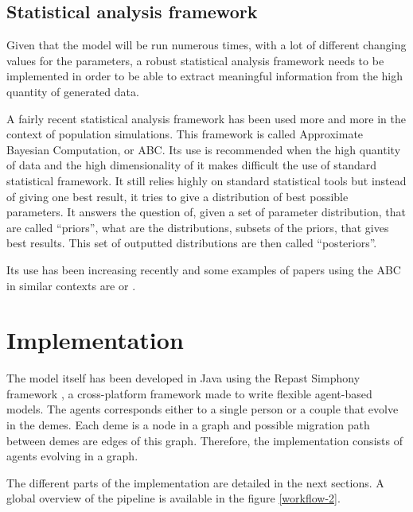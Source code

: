 \documentclass[a4paper,12pt]{report}
\begin{document}
\section{Statistical analysis framework}
Given that the model will be run numerous times, with a lot of different changing values for the parameters, a robust statistical analysis framework needs to be implemented in order to be able to extract meaningful information from the high quantity of generated data.

A fairly recent statistical analysis framework has been used more and more in the context of population simulations. This framework is called Approximate Bayesian Computation, or ABC. Its use is recommended when the high quantity of data and the high dimensionality of it makes difficult the use of standard statistical framework. It still relies highly on standard statistical tools but instead of giving one best result, it tries to give a distribution of best possible parameters. It answers the question of, given a set of parameter distribution, that are called “priors”, what are the distributions, subsets of the priors, that gives best results. This set of outputted distributions are then called “posteriors”.

Its use has been increasing recently and some examples of papers using the ABC in similar contexts are \cite{Gui01} or \cite{Keh01}.

\chapter{Implementation}
The model itself has been developed in Java using the Repast Simphony framework \cite{Nor01}, a cross-platform framework made to write flexible agent-based models. The agents corresponds either to a single person or a couple that evolve in the demes. Each deme is a node in a graph and possible migration path between demes are edges of this graph. Therefore, the implementation consists of agents evolving in a graph.

The different parts of the implementation are detailed in the next sections. A global overview of the pipeline is available in the figure \ref{workflow-2}.

\end{document}
